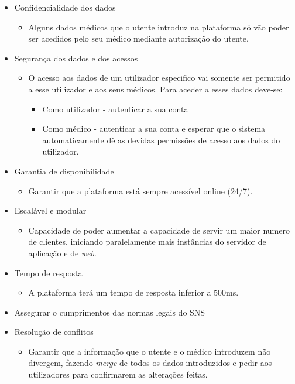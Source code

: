 \documentclass[12pt, a4paper, twoside]{report} %
\begin{document}
\begin{itemize}
\item Confidencialidade dos dados
	\begin{itemize}
	\item Alguns dados médicos que o utente introduz na plataforma só vão poder ser acedidos pelo seu médico mediante autorização do utente.
	\end{itemize}
\item Segurança dos dados e dos acessos
	\begin{itemize}
	\item O acesso aos dados de um utilizador especifico vai somente ser permitido a esse utilizador e aos seus médicos. Para aceder a esses dados deve-se:
		\begin{itemize}
		\item Como utilizador - autenticar a sua conta
		\item Como médico - autenticar a sua conta e esperar que o sistema automaticamente dê as devidas permissões de acesso aos dados do utilizador.
		\end{itemize}
	\end{itemize}
\item Garantia de disponibilidade
	\begin{itemize}
	\item Garantir que a plataforma está sempre acessível online (24/7).
	\end{itemize}
\item Escalável e modular
	\begin{itemize}
	\item Capacidade de poder aumentar a capacidade de servir um maior numero de clientes, iniciando paralelamente mais instâncias do servidor de aplicação e de \textit{web}.
	\end{itemize}
\item Tempo de resposta
	\begin{itemize}
	\item A plataforma terá um tempo de resposta inferior a 500ms.
	\end{itemize}
\item Assegurar o cumprimentos das normas legais do SNS
\item Resolução de conflitos
	\begin{itemize}
	\item Garantir que a informação que o utente e o médico introduzem não divergem, fazendo \textit{merge} de todos os dados introduzidos e pedir aos utilizadores para confirmarem as alterações feitas.

\end{itemize}
\end{itemize}
\end{document}
